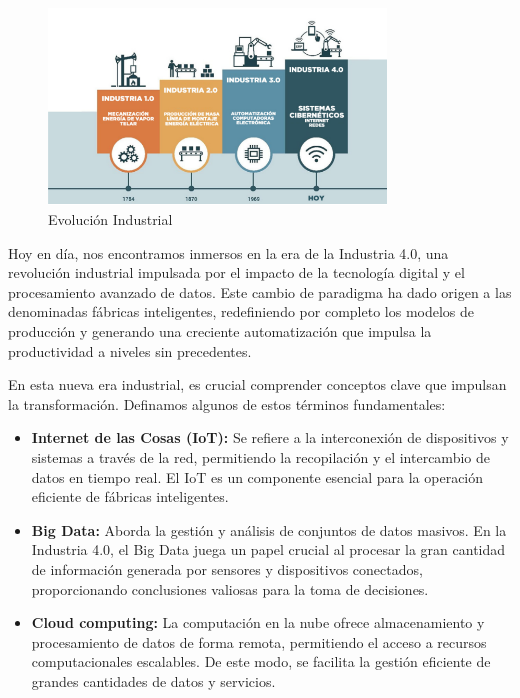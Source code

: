 \documentclass{article}[14pts]
\begin{document}
      \begin{center}
        \begin{figure}[h]
            \centering
            \includegraphics[width=0.8\textwidth]{images/industria.png}
            \caption{Evolución Industrial}
        \end{figure}    
      \end{center}

    Hoy en día, nos encontramos inmersos en la era de la Industria 4.0, una revolución industrial impulsada por el 
    impacto de la tecnología digital y el procesamiento avanzado de datos. Este cambio de paradigma ha dado origen a las denominadas fábricas inteligentes, redefiniendo por completo los modelos de producción y generando una creciente automatización que impulsa la productividad a niveles sin precedentes.

    En esta nueva era industrial, es crucial comprender conceptos clave que impulsan la transformación. Definamos 
    algunos de estos términos fundamentales:

    \begin{itemize}

        \item \textbf{Internet de las Cosas (IoT):} Se refiere a la interconexión de dispositivos y sistemas a través de la red, permitiendo la recopilación y el intercambio de datos en tiempo real. El IoT es un componente esencial para la operación eficiente de fábricas inteligentes.

        \item \textbf{Big Data:} Aborda la gestión y análisis de conjuntos de datos masivos. En la Industria 4.0, el Big Data juega un papel crucial al procesar la gran cantidad de información generada por sensores y dispositivos conectados, proporcionando conclusiones valiosas para la toma de decisiones. 
      
        \item \textbf{Cloud computing:} La computación en la nube ofrece almacenamiento y procesamiento de datos de 
        forma remota, permitiendo el acceso a recursos computacionales escalables. De este modo, se facilita la 
        gestión eficiente de grandes cantidades de datos y servicios.
        
    \end{itemize}
\end{document}
